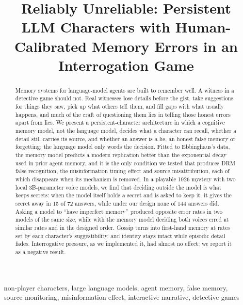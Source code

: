 \documentclass[conference]{IEEEtran}
\begin{document}
\title{Reliably Unreliable: Persistent LLM Characters with Human-Calibrated Memory Errors in an Interrogation Game}

\maketitle

\begin{abstract}
Memory systems for language-model agents are built to remember well. A witness in a detective game
should not. Real witnesses lose details before the gist, take suggestions for things they saw, pick up
what others tell them, and fill gaps with what usually happens, and much of the craft of questioning
them lies in telling those honest errors apart from lies. We present a persistent-character
architecture in which a cognitive memory model, not the language model, decides what a character can
recall, whether a detail still carries its source, and whether an answer is a lie, an honest false
memory or forgetting; the language model only words the decision. Fitted to Ebbinghaus's data, the
memory model predicts a modern replication better than the exponential decay used in prior agent
memory, and it is the only condition we tested that produces DRM false recognition, the
misinformation timing effect and source misattribution, each of which disappears when its mechanism
is removed. In a playable 1926 mystery with two local 3B-parameter voice models, we find that deciding
outside the model is what keeps secrets: when the model itself holds a secret and is asked to keep
it, it gives the secret away in 15 of 72 answers, while under our design none of 144 answers did. Asking a model to
``have imperfect memory'' produced opposite error rates in two models of the same size, while with the
memory model deciding both voices erred at similar rates and in the designed order. Gossip turns into
first-hand memory at rates set by each character's suggestibility, and identity stays intact while
episodic detail fades. Interrogative pressure, as we implemented it, had almost no effect; we report it
as a negative result.
\end{abstract}

\begin{IEEEkeywords}
non-player characters, large language models, agent memory, false memory, source monitoring,
misinformation effect, interactive narrative, detective games
\end{IEEEkeywords}
\end{document}
